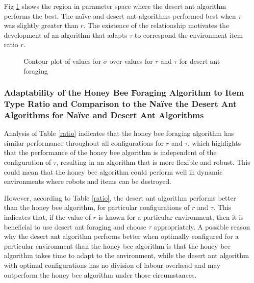 Fig \ref{desertantplot} shows the region in parameter space where the desert ant algorithm performs the best. The na\"ive and desert ant algorithms performed best when $\tau$ was slightly greater than $r$. The existence of the relationship motivates the development of an algorithm that adapts $\tau$ to correspond the environment item ratio $r$.

\begin{figure}[!htb]
\centering
\resizebox{0.8\textwidth}{!}{}
\caption{Contour plot of values for $\sigma$ over values for $r$ and $\tau$ for desert ant foraging}
\label{desertantplot}
\end{figure}


%


\subsubsection{Adaptability of the Honey Bee Foraging Algorithm to Item Type Ratio and Comparison to the Na\"ive the Desert Ant Algorithms for Na\"ive and Desert Ant Algorithms}
\label{Adaptability}
Analysis of Table \ref{ratio} indicates that the honey bee foraging algorithm has similar performance throughout all configurations for $r$ and $\tau$, which highlights that the performance of the honey bee algorithm is independent of the configuration of $\tau$, resulting in an algorithm that is more flexible and robust. This could mean that the honey bee algorithm could perform well in dynamic environments where robots and items can be destroyed.

However, according to Table \ref{ratio}, the desert ant algorithm performs better than the honey bee algorithm, for particular configurations of $r$ and $\tau$. This indicates that, if the value of $r$ is known for a particular environment, then it is beneficial to use desert ant foraging and choose $\tau$ appropriately. A possible reason why the desert ant algorithm performs better when optimally configured for a particular environment than the honey bee algorithm is that the honey bee algorithm takes time to adapt to the environment, while the desert ant algorithm with optimal configurations has no division of labour overhead and may outperform the honey bee algorithm under those circumstances.

